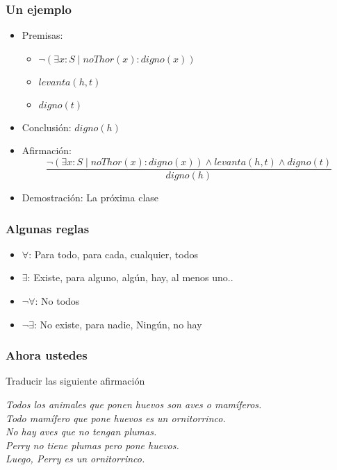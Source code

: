 \documentclass{beamer}
\begin{document}
\begin{frame}[fragile]
    \frametitle{Un ejemplo}
    \begin{itemize}
        \item Premisas:
            \begin{itemize}
                \item $\lnot (\exists x: S \mid noThor(x) : digno(x))$
                \item $levanta(h, t)$
                \item $digno(t)$
            \end{itemize}
        \item Conclusión: $digno(h)$
        \item Afirmación:
            $$\frac{\lnot (\exists x: S \mid noThor(x) : digno(x)) \land levanta(h, t) \land digno(t)}{digno(h)}$$
        \item Demostración: La próxima clase
    \end{itemize}
\end{frame}

\begin{frame}[fragile]
    \frametitle{Algunas reglas}
    \begin{itemize}
        \item $\forall$: Para todo, para cada, cualquier, todos
        \item $\exists$: Existe, para alguno, algún, hay, al menos uno..
        \item $\lnot \forall$: No todos
        \item $\lnot \exists$: No existe, para nadie, Ningún, no hay
    \end{itemize}
\end{frame}

\begin{frame}[fragile]
    \frametitle{Ahora ustedes}
    Traducir las siguiente afirmación
    \begin{center}
        \textit{Todos los animales que ponen huevos son aves o mamíferos. \\
        Todo mamífero que pone huevos es un ornitorrinco. \\
        No hay aves que no tengan plumas. \\
        Perry no tiene plumas pero pone huevos. \\
        Luego, Perry es un ornitorrinco.}
    \end{center}
\end{frame}
\end{document}
